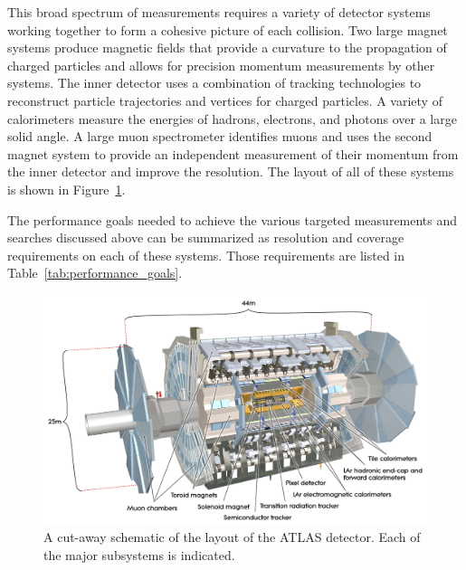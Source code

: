 This broad spectrum of measurements requires a variety of detector systems working together to form a cohesive picture of each collision. 
Two large magnet systems produce magnetic fields that provide a curvature to the propagation of charged particles and allows for precision momentum measurements by other systems.
The inner detector uses a combination of tracking technologies to reconstruct particle trajectories and vertices for charged particles.
A variety of calorimeters measure the energies of hadrons, electrons, and photons over a large solid angle.
A large muon spectrometer identifies muons and uses the second magnet system to provide an independent measurement of their momentum from the inner detector and improve the resolution. 
The layout of all of these systems is shown in Figure~\ref{fig:atlas_overview}.


The performance goals needed to achieve the various targeted measurements and searches discussed above can be summarized as resolution and coverage requirements on each of these systems.
Those requirements are listed in Table~\ref{tab:performance_goals}.

\begin{figure}[hbtp]
\includegraphics[width=\fullfig]{figures/atlas_overview.pdf}
\caption{A cut-away schematic of the layout of the \ac{ATLAS} detector. Each of the major subsystems is indicated.}
\label{fig:atlas_overview}
\end{figure}

